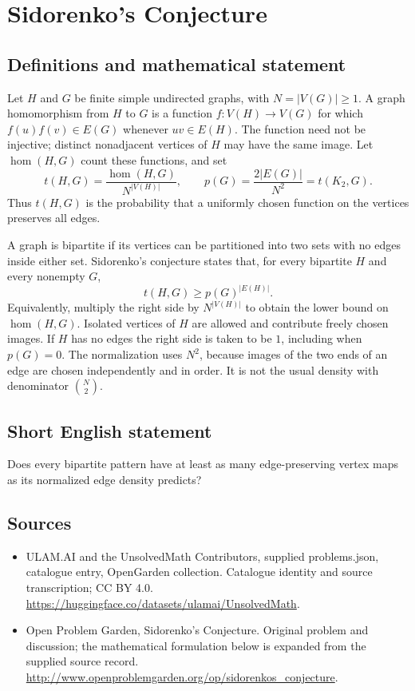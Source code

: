 \documentclass[11pt,a4paper]{article}
\begin{document}
\section*{Sidorenko's Conjecture}\label{statement}

\subsection{Definitions and mathematical statement}
Let $H$ and $G$ be finite simple undirected graphs, with
$N=|V(G)|\geq1$. A graph homomorphism from $H$ to $G$ is a function
$f:V(H)\to V(G)$ for which $f(u)f(v)\in E(G)$ whenever
$uv\in E(H)$. The function need not be injective; distinct
nonadjacent vertices of $H$ may have the same image. Let
$\operatorname{hom}(H,G)$ count these functions, and set
\[
 t(H,G)=\frac{\operatorname{hom}(H,G)}{N^{|V(H)|}},
 \qquad p(G)=\frac{2|E(G)|}{N^2}=t(K_2,G).
\]
Thus $t(H,G)$ is the probability that a uniformly chosen function
on the vertices preserves all edges.

A graph is bipartite if its vertices can be partitioned into two
sets with no edges inside either set. Sidorenko's conjecture states
that, for every bipartite $H$ and every nonempty $G$,
\[
 t(H,G)\geq p(G)^{|E(H)|}.
\]
Equivalently, multiply the right side by $N^{|V(H)|}$ to obtain
the lower bound on $\operatorname{hom}(H,G)$. Isolated vertices of
$H$ are allowed and contribute freely chosen images. If $H$ has
no edges the right side is taken to be $1$, including when $p(G)=0$.
The normalization uses $N^2$, because images of the two ends of
an edge are chosen independently and in order. It is not the usual
density with denominator $\binom N2$.
\subsection{Short English statement}
Does every bipartite pattern have at least as many edge-preserving vertex maps as its normalized edge density predicts?
\subsection{Sources}
\begin{itemize}
\item[S1] ULAM.AI and the UnsolvedMath Contributors, supplied problems.json, catalogue entry, OpenGarden collection. Catalogue identity and source transcription; CC BY 4.0.
\url{https://huggingface.co/datasets/ulamai/UnsolvedMath}.
\item[S2] Open Problem Garden, Sidorenko's Conjecture. Original problem and discussion; the mathematical formulation below is expanded from the supplied source record.
\url{http://www.openproblemgarden.org/op/sidorenkos_conjecture}.
\end{itemize}
\end{document}
